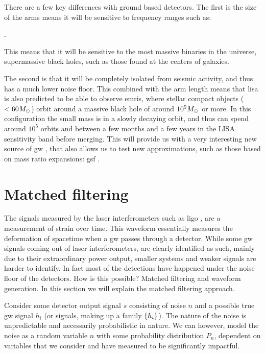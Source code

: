 \documentclass[
  10pt,
  a4paper,
  DIV=11,
  numbers=noendperiod,
  twoside]{scrreprt}
\let\[\relax \let\]\relax %
\DeclareRobustCommand{\[}{\begin{equation}}
\DeclareRobustCommand{\]}{\end{equation}}
\begin{document}
There are a few key differences with ground based detectors. The first
is the size of the arms means it will be sensitive to frequency ranges
such as:

\[
.
\]

This means that it will be sensitive to the most massive binaries in the
universe, supermassive black holes, such as those found at the centers
of galaxies.

The second is that it will be completely isolated from seismic activity,
and thus has a much lower noise floor. This combined with the arm length
means that \gls{lisa} is also predicted to be able to observe
\glspl{emri}, where stellar compact objects (\(<60 M_\odot\)) orbit
around a massive black hole of around \(10^5 M_\odot\) or more. In
this configuration the small mass is in a slowly decaying orbit, and
thus can spend around \(10^5\) orbits and between a few months and a few
years in the LISA sensitivity band before merging. This will provide us
with a very interesting new source of \gls{gw} , that also allows us to
test new approximations, such as those based on mass ratio expansions:
\gls{gsf} .

\hypertarget{matched-filtering}{%
\section{Matched filtering}\label{matched-filtering}}

The signals measured by the laser interferometers such as \gls{ligo} ,
are a measurement of strain over time. This waveform essentially
measures the deformation of spacetime when a \gls{gw} passes through a
detector. While some \gls{gw} signals coming out of laser
interferometers, are clearly identified as such, mainly due to their
extraordinary power output, smaller systems and weaker signals are
harder to identify. In fact most of the detections have happened under
the noise floor of the detectors. How is this possible? Matched
filtering and waveform generation. In this section we will explain the
matched filtering approach.

Consider some detector output signal \(s\) consisting of noise \(n\) and
a possible true \gls{gw} signal \(h_i\) (or signals, making up a family
\(\{h_i \}\)). The nature of the noise is unpredictable and necessarily
probabilistic in nature. We can however, model the noise as a random
variable \(n\) with some probability distribution \(P_n\), dependent on
variables that we consider and have measured to be significantly
impactful.
\end{document}
